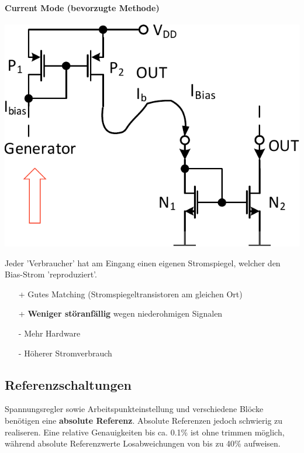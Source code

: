 \paragraph{Current Mode (bevorzugte Methode)}

\begin{minipage}[t]{0.45\columnwidth}
    \includegraphics[width=\columnwidth, align=t]{images/13_current_mode.pdf}
\end{minipage}
\hfill
\begin{minipage}[t]{0.53\columnwidth}
    Jeder 'Verbraucher' hat am Eingang einen eigenen Stromspiegel, welcher den Bias-Strom 'reproduziert'.

    \smallskip

    \begin{itemize}
        \item[+] Gutes Matching (Stromspiegeltransistoren am gleichen Ort)
        \item[+] \textbf{Weniger störanfällig} wegen niederohmigen Signalen
        \item[-] Mehr Hardware
        \item[-] Höherer Stromverbrauch
    \end{itemize}
\end{minipage}



\subsection{Referenzschaltungen}
Spannungsregler sowie Arbeitspunkteinstellung und verschiedene Blöcke benötigen eine \textbf{absolute Referenz}.
Absolute Referenzen jedoch schwierig zu realiseren.
Eine relative Genauigkeiten bis ca. 0.1\% ist ohne trimmen möglich, während absolute Referenzwerte Losabweichungen von bis zu 40\% aufweisen.

